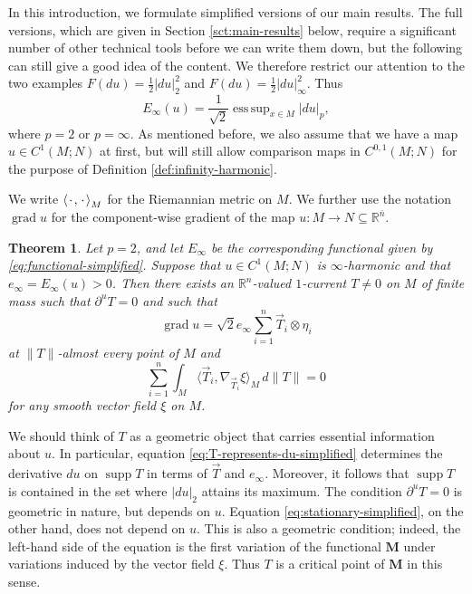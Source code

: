 \documentclass[10pt,a4paper]{amsart}
\newcommand{\R}{\mathbb{R}}
\newcommand{\M}{\mathbf{M}}
\newcommand{\ndim}{{\bar{n}}}
\DeclareMathOperator*{\esssup}{ess \, sup}
\DeclareMathOperator{\supp}{supp}
\DeclareMathOperator{\grad}{grad}
\newcommand{\blank}{{\mkern 2mu\cdot\mkern 2mu}}
\newcommand{\scp}[2]{\left\langle #1, #2 \right\rangle}
\newcommand{\smallscp}[2]{\langle #1, #2 \rangle}
\newtheorem{theorem}{Theorem}
\begin{document}
In this introduction, we formulate simplified versions of our main results.
The full versions, which are given in Section \ref{sct:main-results} below, require a significant
number of other technical tools before we can write them down, but the following can
still give a good idea of the content. We therefore restrict our attention to the two examples $F(du) = \frac{1}{2} |du|_2^2$ and $F(du) = \frac{1}{2} |du|_\infty^2$. Thus
\begin{equation} \label{eq:functional-simplified}
E_\infty(u) = \frac{1}{\sqrt{2}} \esssup_{x \in M} |du|_p,
\end{equation}
where $p = 2$ or $p = \infty$. As mentioned before, we also assume that
we have a map $u \in C^1(M; N)$ at first, but will still
allow comparison maps in $C^{0, 1}(M; N)$ for the purpose of
Definition \ref{def:infinity-harmonic}.

We write $\scp{\blank}{\blank}_M$ for the Riemannian metric on $M$.
We further use the notation $\grad u$ for the component-wise gradient
of the map $u \colon M \to N \subseteq \R^\ndim$.

\begin{theorem} \label{thm:geodesic-simplified}
Let $p = 2$, and let $E_\infty$ be the corresponding functional given by \eqref{eq:functional-simplified}. Suppose that $u \in C^1(M; N)$ is $\infty$-harmonic and that $e_\infty = E_\infty(u) > 0$.
Then there exists an $\R^n$-valued $1$-current $T \neq 0$ on $M$ of finite mass such that $\partial^u T = 0$ and such that
\begin{equation} \label{eq:T-represents-du-simplified}
\grad u = \sqrt{2} e_\infty \sum_{i = 1}^n \vec{T}_i \otimes \eta_i
\end{equation}
at $\|T\|$-almost every point of $M$ and
\begin{equation} \label{eq:stationary-simplified}
\sum_{i = 1}^n \int_M \smallscp{\vec{T}_i}{\nabla_{\vec{T}_i} \xi}_M \, d\|T\| = 0
\end{equation}
for any smooth vector field $\xi$ on $M$.
\end{theorem}

We should think of $T$ as a geometric object that carries essential information
about $u$. In particular, equation \eqref{eq:T-represents-du-simplified} determines the
derivative $du$ on $\supp T$ in terms of $\vec{T}$ and $e_\infty$. Moreover,
it follows that $\supp T$ is contained in the set where $|du|_2$ attains its
maximum. The condition $\partial^u T = 0$ is geometric in nature, but depends
on $u$. Equation \eqref{eq:stationary-simplified}, on the other hand, does
not depend on $u$. This is also a geometric condition; indeed, the left-hand
side of the equation is the first variation of the functional $\M$ under variations induced by the vector field $\xi$. Thus $T$ is a critical point of $\M$ in this sense.
\end{document}
